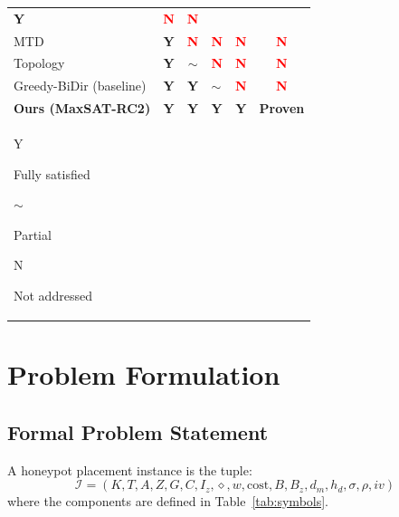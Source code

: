 \documentclass[journal]{IEEEtran}
\begin{document}
\begin{table}[!htb]
\begin{tabular}{lcc>{\centering\arraybackslash}p{1.0cm}cc}
  \cellcolor{capGreen}\textcolor{green!60!black}{\textbf{Y}} &
  \cellcolor{capRed}\textcolor{red}{\textbf{N}} &
  \cellcolor{capRed}\textcolor{red}{\textbf{N}} \\
MTD~\cite{zhu2013} &
  \cellcolor{capGreen}\textcolor{green!60!black}{\textbf{Y}} &
  \cellcolor{capRed}\textcolor{red}{\textbf{N}} &
  \cellcolor{capRed}\textcolor{red}{\textbf{N}} &
  \cellcolor{capRed}\textcolor{red}{\textbf{N}} &
  \cellcolor{capRed}\textcolor{red}{\textbf{N}} \\
Topology~\cite{jajodia2005} &
  \cellcolor{capGreen}\textcolor{green!60!black}{\textbf{Y}} &
  \cellcolor{capYellow}$\sim$ &
  \cellcolor{capRed}\textcolor{red}{\textbf{N}} &
  \cellcolor{capRed}\textcolor{red}{\textbf{N}} &
  \cellcolor{capRed}\textcolor{red}{\textbf{N}} \\
Greedy-BiDir (baseline) &
  \cellcolor{capGreen}\textcolor{green!60!black}{\textbf{Y}} &
  \cellcolor{capGreen}\textcolor{green!60!black}{\textbf{Y}} &
  \cellcolor{capYellow}$\sim$ &
  \cellcolor{capRed}\textcolor{red}{\textbf{N}} &
  \cellcolor{capRed}\textcolor{red}{\textbf{N}} \\
\midrule
\rowcolor{capOurs}
\textbf{Ours (MaxSAT-RC2)} &
  \textcolor{green!60!black}{\textbf{Y}} &
  \textcolor{green!60!black}{\textbf{Y}} &
  \textcolor{green!60!black}{\textbf{Y}} &
  \textcolor{green!60!black}{\textbf{Y}} &
  \textbf{Proven} \\
\bottomrule
\multicolumn{6}{l}{\footnotesize
  \colorbox{capGreen}{\strut Y} Fully satisfied \quad
  \colorbox{capYellow}{\strut$\sim$} Partial \quad
  \colorbox{capRed}{\strut N} Not addressed}
\end{tabular}
\end{table}

\section{Problem Formulation}
\label{sec:problem}

\subsection{Formal Problem Statement}

A honeypot placement instance is the tuple:
\begin{equation}
  \mathcal{I} = (K,T,A,Z,G,C,I_z,\diamond,w,\mathrm{cost},B,B_z,
                 d_m,h_d,\sigma,\rho,iv)
  \label{eq:instance}
\end{equation}
where the components are defined in Table~\ref{tab:symbols}.
\end{document}
